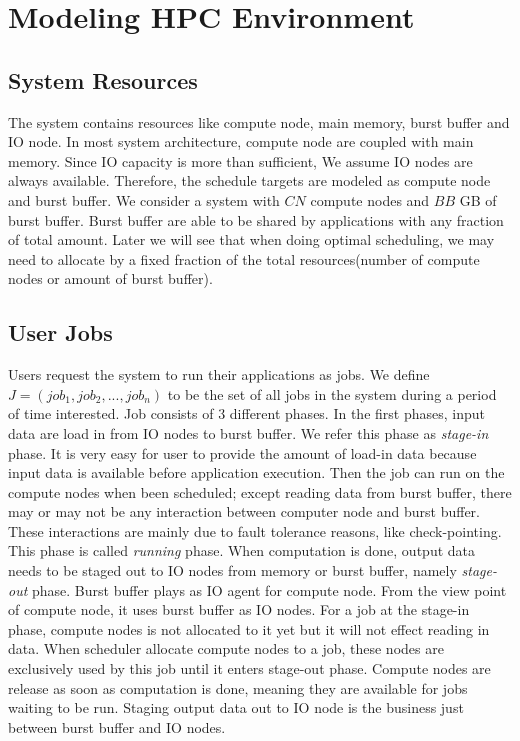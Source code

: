\section{Modeling HPC Environment}
\label{Sec:Model}

\subsection{System Resources}
The system contains resources like compute node, main memory, burst buffer and IO node.
In most system architecture, compute node are coupled with main memory.
Since IO capacity is more than sufficient, We assume IO nodes are always available.
Therefore, the schedule targets are modeled as compute node and burst buffer.
We consider a system with $CN$ compute nodes and $BB$ GB of burst buffer.
Burst buffer are able to be shared by applications with any fraction of total amount.
Later we will see that when doing optimal scheduling, we may need to allocate by a fixed
fraction of the total resources(number of compute nodes or amount of burst buffer).

\subsection{User Jobs}
Users request the system to run their applications as jobs.
We define $J = (job_1, job_2,..., job_n)$ to be the set of all jobs in the system during
a period of time interested.
Job consists of 3 different phases.
In the first phases, input data are load in from IO nodes to burst buffer.
We refer this phase as \textit{stage-in} phase.
It is very easy for user to provide the amount of load-in data because input data is available before application execution. 
Then the job can run on the compute nodes when been scheduled;
except reading data from burst buffer, there may or may not be any interaction between computer node and burst buffer.
These interactions are mainly due to fault tolerance reasons, like check-pointing.
This phase is called \textit{running} phase.
When computation is done, output data needs to be staged out to IO nodes from memory or burst buffer, namely \textit{stage-out} phase.
Burst buffer plays as IO agent for compute node.
From the view point of compute node, it uses burst buffer as IO nodes.
For a job at the stage-in phase, compute nodes is not allocated to it yet but it will not effect reading in data.
When scheduler allocate compute nodes to a job, these nodes are exclusively used by this job until it enters stage-out phase.
Compute nodes are release as soon as computation is done, meaning they are available for jobs waiting to be run.
Staging output data out to IO node is the business just between burst buffer and IO nodes.


